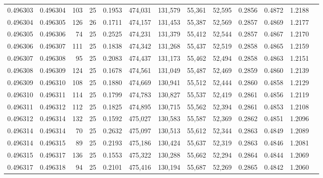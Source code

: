 \begin{tabular}{rrrrrrrrrrrrr}
0.496303 & 0.496304 &   103 &  25 &                                     0.1953 & 474,031 & 131,579 &  55,361 &  52,595 & 0.2856 & 0.4872 & 1.2188 \\
0.496304 & 0.496305 &   126 &  26 &                                     0.1711 & 474,157 & 131,453 &  55,387 &  52,569 & 0.2857 & 0.4869 & 1.2177 \\
0.496305 & 0.496306 &    74 &  25 &                                     0.2525 & 474,231 & 131,379 &  55,412 &  52,544 & 0.2857 & 0.4867 & 1.2170 \\
0.496306 & 0.496307 &   111 &  25 &                                     0.1838 & 474,342 & 131,268 &  55,437 &  52,519 & 0.2858 & 0.4865 & 1.2159 \\
0.496307 & 0.496308 &    95 &  25 &                                     0.2083 & 474,437 & 131,173 &  55,462 &  52,494 & 0.2858 & 0.4863 & 1.2151 \\
0.496308 & 0.496309 &   124 &  25 &                                     0.1678 & 474,561 & 131,049 &  55,487 &  52,469 & 0.2859 & 0.4860 & 1.2139 \\
0.496309 & 0.496310 &   108 &  25 &                                     0.1880 & 474,669 & 130,941 &  55,512 &  52,444 & 0.2860 & 0.4858 & 1.2129 \\
0.496310 & 0.496311 &   114 &  25 &                                     0.1799 & 474,783 & 130,827 &  55,537 &  52,419 & 0.2861 & 0.4856 & 1.2119 \\
0.496311 & 0.496312 &   112 &  25 &                                     0.1825 & 474,895 & 130,715 &  55,562 &  52,394 & 0.2861 & 0.4853 & 1.2108 \\
0.496312 & 0.496314 &   132 &  25 &                                     0.1592 & 475,027 & 130,583 &  55,587 &  52,369 & 0.2862 & 0.4851 & 1.2096 \\
0.496314 & 0.496314 &    70 &  25 &                                     0.2632 & 475,097 & 130,513 &  55,612 &  52,344 & 0.2863 & 0.4849 & 1.2089 \\
0.496314 & 0.496315 &    89 &  25 &                                     0.2193 & 475,186 & 130,424 &  55,637 &  52,319 & 0.2863 & 0.4846 & 1.2081 \\
0.496315 & 0.496317 &   136 &  25 &                                     0.1553 & 475,322 & 130,288 &  55,662 &  52,294 & 0.2864 & 0.4844 & 1.2069 \\
0.496317 & 0.496318 &    94 &  25 &                                     0.2101 & 475,416 & 130,194 &  55,687 &  52,269 & 0.2865 & 0.4842 & 1.2060 \\

\end{tabular}
